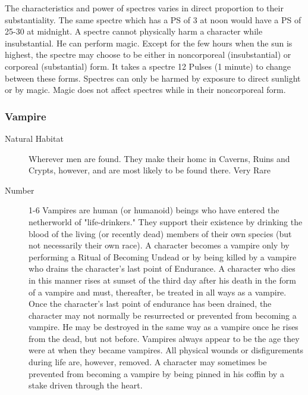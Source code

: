 \begin{multicols}{2}
\begin{description}
\setlength\itemsep{0pt}

\item[Comments] The characteristics and power of spectres varies in direct
proportion to their substantiality. The same spectre which has a PS of
3 at noon would have a PS of 25-30 at midnight. A spectre cannot
physically harm a character while insubstantial.  He can perform
magic. Except for the few hours when the sun is highest, the spectre
may choose to be either in noncorporeal (insubstantial) or corporeal
(substantial) form. It takes a spectre 12 Pulses (1 minute) to change
between these forms. Spectres can only be harmed by exposure to direct
sunlight or by magic.  Magic does not affect spectres while in their
noncorporeal form.

\end{description}

\subsubsection{Vampire}

\begin{description}
\item[Natural Habitat] Wherever men are found. They make their homc in Caverns,
Ruins and Crypts, however, and are most likely to be found there.
 Very Rare

\item[Number] 1-6
  Vampires are human (or humanoid) beings who
have entered the netherworld of "life-drinkers." They support
their existence by drinking the blood of the living (or recently
dead) members of their own species (but not necessarily their
own race). A character becomes a vampire only by performing a
Ritual of Becoming Undead or by being killed by a vampire who
drains the character's last point of Endurance. A character who
dies in this manner rises at sunset of the third day after his
death in the form of a vampire and must, thereafter, be treated
in all ways as a vampire. Once the character's last point of
endurance has been drained, the character may not normally be
resurrected or prevented from becoming a vampire. He may be
destroyed in the same way as a vampire once he rises from the
dead, but not before. Vampires always appear to be the age they
were at when they became vampires. All physical wounds or
disfigurements during life are, however, removed. A character
may sometimes be prevented from becoming a vampire by being
pinned in his coffin by a stake driven through the heart.



\end{description}
\end{multicols}
